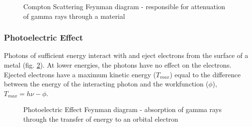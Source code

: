 \begin{figure}[h]
\begin{center}
\end{center}
\caption{Compton Scattering Feynman diagram - responsible for attenuation of gamma rays through a material\cite{comptonscatteringfeynman}}
\label{fig:comptonscattering}
\end{figure}


\subsubsection{Photoelectric Effect}

Photons of sufficient energy interact with and eject electrons from the surface of a metal (fig. \ref{fig:photoelectric}).  At lower energies, the photons have no effect on the electrons.  Ejected electrons have a maximum kinetic energy ($T_{max}$) equal to the difference between the energy of the interacting photon and the workfunction ($\phi$), $T_{max} = h \nu - \phi$.

\begin{figure}[h]
\begin{center}
\end{center}
\caption{Photoelectric Effect Feynman diagram - absorption of gamma rays through the transfer of energy to an orbital electron\cite{photoelectricfeynman}}
\label{fig:photoelectric}
\end{figure}



